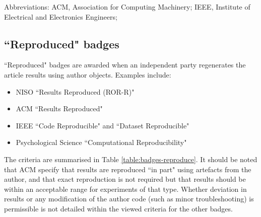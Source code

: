 \vspace*{-1.5\baselineskip}
\footnotesize
Abbreviations: ACM, Association for Computing Machinery; IEEE, Institute of Electrical and Electronics Engineers;
\normalsize 
\\

\newpage
\subsection{``Reproduced" badges}

``Reproduced" badges are awarded when an independent party regenerates the article results using author objects.\autocite{niso_reproducibility_badging_and_definitions_working_group_reproducibility_2021} Examples include:
\begin{itemize}
    \item NISO ``Results Reproduced (ROR-R)"\autocite{niso_reproducibility_badging_and_definitions_working_group_reproducibility_2021}
    \item ACM ``Results Reproduced"\autocite{association_for_computing_machinery_acm_artifact_2020}
    \item IEEE ``Code Reproducible" and ``Dataset Reproducible"\autocite{institute_of_electrical_and_electronics_engineers_ieee_about_nodate}
    \item Psychological Science ``Computational Reproducibility"\autocite{hardwicke_transparency_2023,association_for_psychological_science_aps_psychological_2023}
\end{itemize}

The criteria are summarised in Table \ref{table:badges-reproduce}. It should be noted that ACM specify that results are reproduced ``in part" using artefacts from the author, and that exact reproduction is not required but that results should be within an acceptable range for experiments of that type.\autocite{association_for_computing_machinery_acm_artifact_2020} Whether deviation in results or any modification of the author code (such as minor troubleshooting) is permissible is not detailed within the viewed criteria for the other badges.

